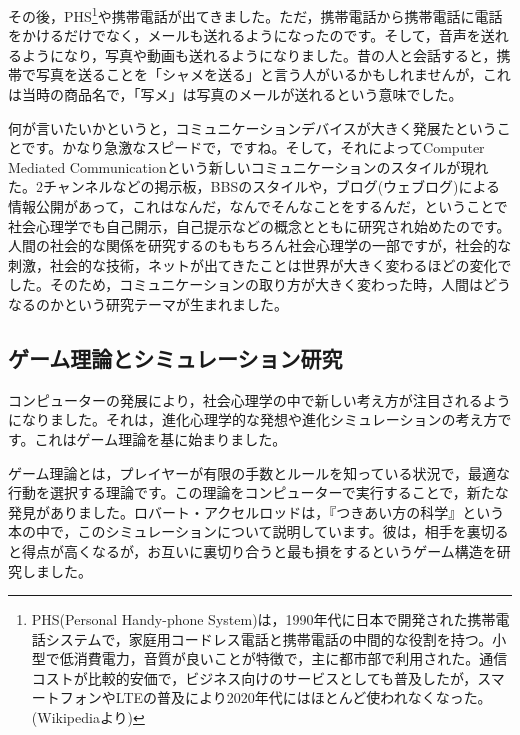 \documentclass{ltjsbook}
\begin{document}
その後，PHS\footnote{PHS(Personal Handy-phone System)は，1990年代に日本で開発された携帯電話システムで，家庭用コードレス電話と携帯電話の中間的な役割を持つ。小型で低消費電力，音質が良いことが特徴で，主に都市部で利用された。通信コストが比較的安価で，ビジネス向けのサービスとしても普及したが，スマートフォンやLTEの普及により2020年代にはほとんど使われなくなった。(Wikipediaより)}や携帯電話が出てきました。ただ，携帯電話から携帯電話に電話をかけるだけでなく，メールも送れるようになったのです。そして，音声を送れるようになり，写真や動画も送れるようになりました。昔の人と会話すると，携帯で写真を送ることを「シャメを送る」と言う人がいるかもしれませんが，これは当時の商品名で，「写メ」は写真のメールが送れるという意味でした。

何が言いたいかというと，コミュニケーションデバイスが大きく発展たということです。かなり急激なスピードで，ですね。そして，それによってComputer Mediated Communicationという新しいコミュニケーションのスタイルが現れた。2チャンネルなどの掲示板，BBSのスタイルや，ブログ(ウェブログ)による情報公開があって，これはなんだ，なんでそんなことをするんだ，ということで社会心理学でも自己開示，自己提示などの概念とともに研究され始めたのです。人間の社会的な関係を研究するのももちろん社会心理学の一部ですが，社会的な刺激，社会的な技術，ネットが出てきたことは世界が大きく変わるほどの変化でした。そのため，コミュニケーションの取り方が大きく変わった時，人間はどうなるのかという研究テーマが生まれました。

\subsection{ゲーム理論とシミュレーション研究}
コンピューターの発展により，社会心理学の中で新しい考え方が注目されるようになりました。それは，進化心理学的な発想や進化シミュレーションの考え方です。これはゲーム理論を基に始まりました。

ゲーム理論とは，プレイヤーが有限の手数とルールを知っている状況で，最適な行動を選択する理論です。この理論をコンピューターで実行することで，新たな発見がありました。ロバート・アクセルロッドは，『つきあい方の科学』という本\parencite{Axelrod}の中で，このシミュレーションについて説明しています。彼は，相手を裏切ると得点が高くなるが，お互いに裏切り合うと最も損をするというゲーム構造を研究しました。
\end{document}

